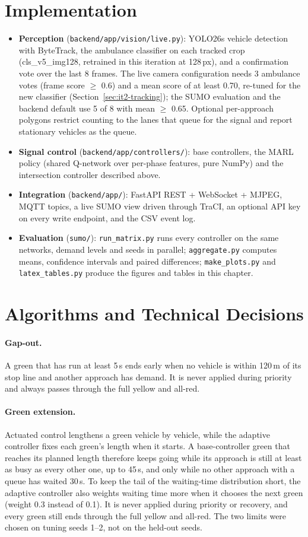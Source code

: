 \section{Implementation}
\begin{itemize}
\item \textbf{Perception} (\texttt{backend/app/vision/live.py}): YOLO26s vehicle detection with ByteTrack,
the ambulance classifier on each tracked crop (cls\_v5\_img128, retrained in this iteration at 128\,px), and a
confirmation vote over the last 8 frames. The live camera configuration needs 3 ambulance votes (frame score
$\geq$ 0.6) and a mean score of at least 0.70, re-tuned for the new classifier
(Section~\ref{sec:it2-tracking}); the SUMO evaluation and the backend default use 5 of 8 with mean
$\geq$ 0.65. Optional per-approach polygons restrict counting to the lanes that queue for the signal and
report stationary vehicles as the queue.
\item \textbf{Signal control} (\texttt{backend/app/controllers/}): base controllers, the MARL policy
(shared Q-network over per-phase features, pure NumPy) and the intersection controller described above.
\item \textbf{Integration} (\texttt{backend/app/}): FastAPI REST + WebSocket + MJPEG, MQTT topics, a live
SUMO view driven through TraCI, an optional API key on every write endpoint, and the CSV event log.
\item \textbf{Evaluation} (\texttt{sumo/}): \texttt{run\_matrix.py} runs every controller on the same
networks, demand levels and seeds in parallel; \texttt{aggregate.py} computes means, confidence intervals and
paired differences; \texttt{make\_plots.py} and \texttt{latex\_tables.py} produce the figures and tables in
this chapter.
\end{itemize}

\section{Algorithms and Technical Decisions}
\paragraph{Gap-out.} A green that has run at least 5\,s ends early when no vehicle is within 120\,m of its
stop line and another approach has demand. It is never applied during priority and always passes through
the full yellow and all-red.
\paragraph{Green extension.} Actuated control lengthens a green vehicle by vehicle, while the adaptive controller
fixes each green's length when it starts. A base-controller green that reaches its planned length therefore keeps
going while its approach is still at least as busy as every other one, up to 45\,s, and only while no other
approach with a queue has waited 30\,s. To keep the tail of the waiting-time distribution short, the adaptive
controller also weights waiting time more when it chooses the next green (weight 0.3 instead of 0.1). It is never applied during priority or recovery, and every green still
ends through the full yellow and all-red. The two limits were chosen on tuning seeds 1--2, not on the held-out
seeds.
